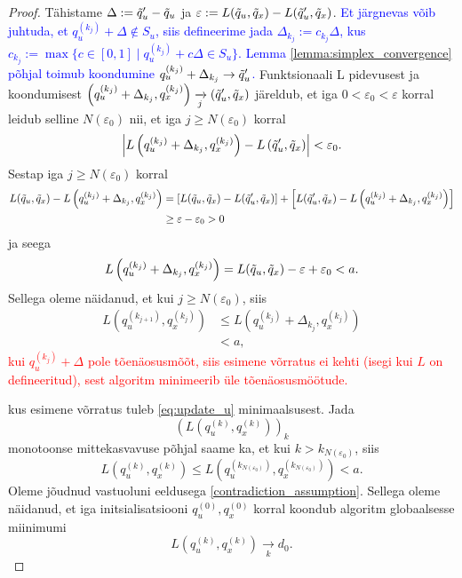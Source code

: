 \begin{proof}
Tähistame $\Delta := \Tilde{q}'_u - \Tilde{q}_u$ ja $\varepsilon := L(\Tilde{q}_u, \Tilde{q}_x) - L(\Tilde{q}'_u, \Tilde{q}_x)$.
\textcolor{blue}{Et järgnevas võib juhtuda, et $q_u^{(k_j)} + \Delta\notin S_u$, siis defineerime jada $\Delta_{k_j}:=c_{k_j}\Delta$, kus $c_{k_j}:=\max\{c\in[0,1] \mid q_u^{(k_j)} + c\Delta\in S_u\}$. Lemma \ref{lemma:simplex_convergence} põhjal toimub koondumine $q_u^{(k_j)} + \Delta_{k_j} \rightarrow  \Tilde{q}_u'$.}
Funktsionaali L pidevusest ja koondumisest $\left(q_u^{(k_j)} + \Delta_{k_j}, q_x^{(k_j)}\right) \xrightarrow[j]{} \left( \Tilde{q}_u', \Tilde{q}_x \right)$ järeldub, et iga $0 < \varepsilon_0 < \varepsilon$ korral leidub selline $N(\varepsilon_0)$ nii, et iga $j \ge N(\varepsilon_0)$ korral
$$\left| L\left(q_u^{(k_j)} + \Delta_{k_j}, q_x^{(k_j)}\right) - L\left(\Tilde{q}'_u, \Tilde{q}_x \right) \right| < \varepsilon_0.$$
Sestap iga $j \ge N(\varepsilon_0)$ korral
\begin{align*}
    L(\Tilde{q}_u, \Tilde{q}_x) - L\left(q_u^{(k_j)}+\Delta_{k_j},q_x^{(k_j)}\right) &= \left[L(\Tilde{q}_u, \Tilde{q}_x) - L(\Tilde{q}'_u, \Tilde{q}_x) \right] + \left[L(\Tilde{q}'_u, \Tilde{q}_x) -  L\left(q_u^{(k_j)}+\Delta_{k_j},q_x^{(k_j)}\right)\right]\\
    &\ge \varepsilon - \varepsilon_0 > 0
\end{align*}
ja seega
$$L\left(q_u^{(k_j)}+\Delta_{k_j},q_x^{(k_j)}\right) = L(\Tilde{q}_u, \Tilde{q}_x) - \varepsilon + \varepsilon_0 < a.$$ Sellega oleme näidanud, et kui $j \ge N(\varepsilon_0)$, siis
\begin{align*}
    L\left(q_u^{(k_{j+1})},q_x^{(k_j)}\right) &\le L\left(q_u^{(k_j)}+\Delta_{k_j},q_x^{(k_j)}\right)\\
    &< a,
\end{align*}
\textcolor{red}{kui  $q_u^{(k_j)}+\Delta$ pole tõenäosusmõõt, siis esimene võrratus ei kehti (isegi kui $L$ on defineeritud), sest algoritm minimeerib üle tõenäosusmöötude.}


kus esimene võrratus tuleb \eqref{eq:update_u} minimaalsusest. Jada 
$$\left(L\left(q_u^{(k)},q_x^{(k)}\right)\right)_k$$
monotoonse mittekasvavuse põhjal saame ka, et kui $k > k_{N(\varepsilon_0)}$, siis
$$L\left(q_u^{(k)},q_x^{(k)}\right) \le L\left(q_u^{(k_{N(\varepsilon_0)})},q_x^{(k_{N(\varepsilon_0)})}\right) < a.$$
Oleme jõudnud vastuoluni eeldusega \eqref{contradiction_assumption}. Sellega oleme näidanud, et iga initsialisatsiooni $q_u^{(0)}, q_x^{(0)}$ korral koondub algoritm globaalsesse miinimumi
$$L\left(q_u^{(k)},q_x^{(k)}\right) \xrightarrow[k]{} d_0.$$ \end{proof}

